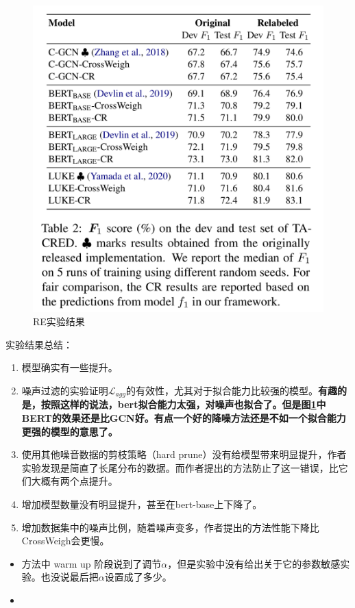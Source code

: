 \documentclass{article}
\begin{document}
\begin{figure}[H]
    \centering
    \includegraphics[width=.8\textwidth]{fig/main result1.png}
    \caption{RE实验结果}
    \label{table2}
\end{figure}

实验结果总结：
\begin{enumerate}
    \item 模型确实有一些提升。
    \item 噪声过滤的实验证明$\mathcal{L}_{agg}$的有效性，尤其对于拟合能力比较强的模型。\textbf{有趣的是，按照这样的说法，bert拟合能力太强，对噪声也拟合了。但是图\ref{table2}中BERT的效果还是比GCN好。有点一个好的降噪方法还是不如一个拟合能力更强的模型的意思了。}
    \item 使用其他噪音数据的剪枝策略（hard prune）没有给模型带来明显提升，作者实验发现是简直了长尾分布的数据。而作者提出的方法防止了这一错误，比它们大概有两个点提升。
    \item 增加模型数量没有明显提升，甚至在bert-base上下降了。
    \item 增加数据集中的噪声比例，随着噪声变多，作者提出的方法性能下降比CrossWeigh会更慢。
\end{enumerate}

\begin{itemize}
    \item 方法中 warm up 阶段说到了调节$\alpha$，但是实验中没有给出关于它的参数敏感实验。也没说最后把$\alpha$设置成了多少。
    \item 
\end{itemize}
\end{document}
